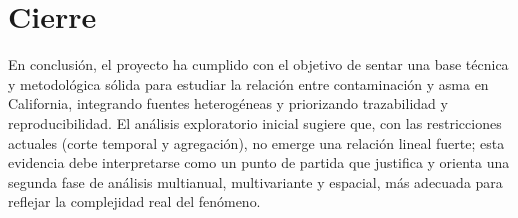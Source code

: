 \section{Cierre}
En conclusión, el proyecto ha cumplido con el objetivo de sentar una base técnica y metodológica sólida para estudiar
la relación entre contaminación y asma en California, integrando fuentes heterogéneas y priorizando trazabilidad y
reproducibilidad. El análisis exploratorio inicial sugiere que, con las restricciones actuales (corte temporal y
agregación), no emerge una relación lineal fuerte; esta evidencia debe interpretarse como un punto de partida que
justifica y orienta una segunda fase de análisis multianual, multivariante y espacial, más adecuada para reflejar la
complejidad real del fenómeno.
